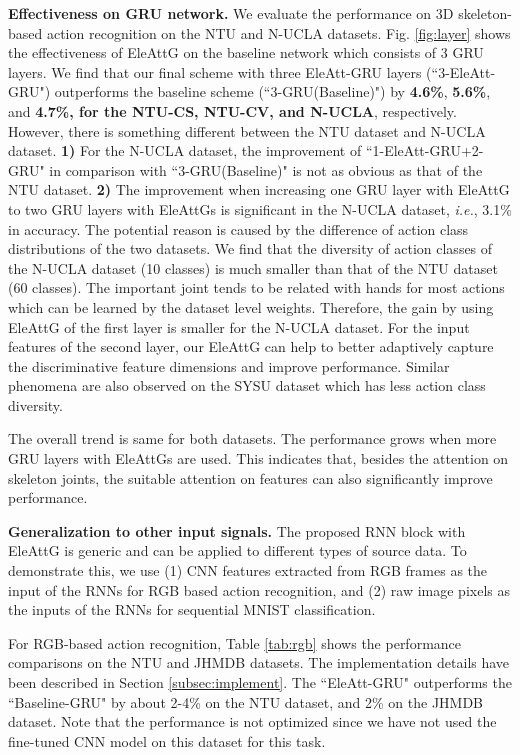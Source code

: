 \documentclass[journal]{IEEEtran}
\newcommand{\EleAttGn}{{EleAttG}}
\begin{document}
\textbf{Effectiveness on GRU network.} We evaluate the performance on 3D skeleton-based action recognition on the NTU and N-UCLA datasets. Fig. \ref{fig:layer} shows the effectiveness of {\EleAttGn} on the baseline network which consists of 3 GRU layers. We find that our final scheme with three EleAtt-GRU layers (``3-EleAtt-GRU") outperforms the baseline scheme (``3-GRU(Baseline)")  by {\bf{4.6\%}}, {\bf{5.6\%}}, and {\bf{4.7\%}, for the NTU-CS, NTU-CV, and N-UCLA}, respectively. However, there is something different between the NTU dataset and N-UCLA dataset. \textbf{1)} For the N-UCLA dataset, the improvement of ``1-EleAtt-GRU+2-GRU" in comparison with ``3-GRU(Baseline)"  is not as obvious as that of the NTU dataset. \textbf{2)} The improvement when increasing one GRU layer with EleAttG to two GRU layers with EleAttGs is significant in the N-UCLA dataset, {\it i.e.}, 3.1\% in accuracy. The potential reason is caused by the difference of action class distributions of the two datasets. We find that the diversity of action classes of the N-UCLA dataset (10 classes) is much smaller than that of the NTU dataset (60 classes). The important joint tends to be related with hands for most actions which can be learned by the dataset level weights. Therefore, the gain by using EleAttG of the first layer is smaller for the N-UCLA dataset. For the input features of the second layer, our EleAttG can help to better adaptively capture the discriminative feature dimensions and improve performance. Similar phenomena are also observed on the SYSU dataset which has less action class diversity.

The overall trend is same for both datasets. The performance grows when more GRU layers with EleAttGs are used. This indicates that, besides the attention on skeleton joints, the suitable attention on features can also significantly improve performance.

\textbf{Generalization to other input signals.} The proposed RNN block with {\EleAttGn} is generic and can be applied to different types of source data. To demonstrate this, we use (1) CNN features extracted from RGB frames as the input of the RNNs for RGB based action recognition, and (2) raw image pixels as the inputs of the RNNs for sequential MNIST classification. 

For RGB-based action recognition, Table \ref{tab:rgb} shows the performance comparisons on the NTU and JHMDB datasets. The implementation details have been described in Section \ref{subsec:implement}. The ``EleAtt-GRU" outperforms the ``Baseline-GRU" by about 2-4\% on the NTU dataset, and 2\% on the JHMDB dataset. Note that the performance is not optimized since we have not used the fine-tuned CNN model on this dataset for this task.
\end{document}
